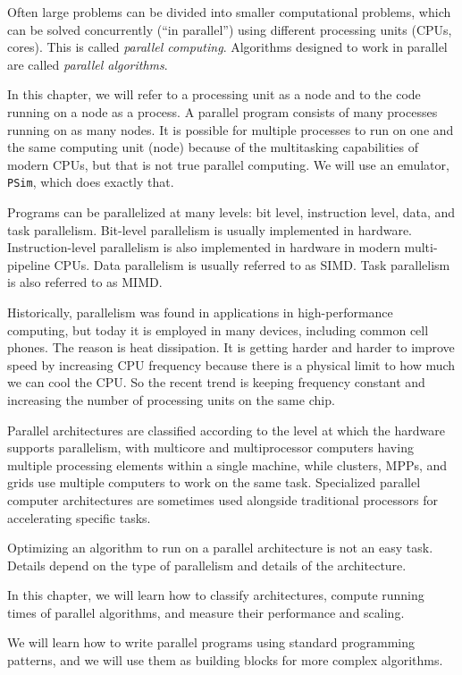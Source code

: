 \documentclass[justified, sixbynine]{tufte-book}
\def\ft{\small\tt}
\theoremstyle{plain}%
\newtheorem * {corollary}{Corollary}
\theoremstyle{definition}
\theoremstyle{remark}
\newtheorem * {remark}{Remark}
\newtheorem * {note}{Note}
\begin{document}
\begin{fullwidth}
Often large problems can be divided into smaller computational problems, which can be solved concurrently (``in parallel'') using different processing units (CPUs, cores). This is called {\it parallel computing}. Algorithms designed to work in parallel are called {\it parallel algorithms}.

In this chapter, we will refer to a processing unit as a node and to the code running on a node as a process. A parallel program consists of many processes running on as many nodes. It is possible for multiple processes to run on one and the same computing unit (node) because of the multitasking capabilities of modern CPUs, but that is not true parallel computing. We will use an emulator, {\ft PSim}, which does exactly that.

Programs can be parallelized at many levels: bit level, instruction level, data, and task parallelism. Bit-level parallelism is usually implemented in hardware. Instruction-level parallelism is also implemented in hardware in modern multi-pipeline CPUs.  Data parallelism is usually referred to as SIMD. Task parallelism is also referred to as MIMD.

Historically, parallelism was found in applications in high-performance computing, but today it is employed in many devices, including common cell phones. The reason is heat dissipation. It is getting harder and harder to improve speed by increasing CPU frequency because there is a physical limit to how much we can cool the CPU. So the recent trend is keeping frequency constant and increasing the number of processing units on the same chip.

Parallel architectures are classified according to the level at which the hardware supports parallelism, with multicore and multiprocessor computers having multiple processing elements within a single machine, while clusters, MPPs, and grids use multiple computers to work on the same task. Specialized parallel computer architectures are sometimes used alongside traditional processors for accelerating specific tasks.

Optimizing an algorithm to run on a parallel architecture is not an easy task. Details depend on the type of parallelism and details of the architecture.

In this chapter, we will learn how to classify architectures, compute running times of parallel algorithms, and measure their performance and scaling.

We will learn how to write parallel programs using standard programming patterns, and we will use them as building blocks for more complex algorithms.


\end{fullwidth}
\end{document}
